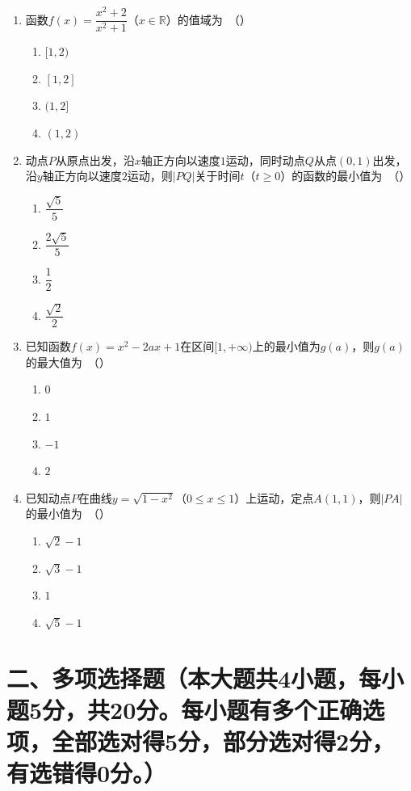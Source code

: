 \documentclass[12pt, a4paper]{ctexart}
\begin{document}
\begin{enumerate}
\item 函数$f(x)=\dfrac{x^2+2}{x^2+1}$（$x\in\mathbb{R}$）的值域为\ （\quad）
\begin{enumerate}[label=\Alph*., itemsep=0pt, topsep=2pt]
\item $[1,2)$ \quad \item $[1,2]$ \quad \item $(1,2]$ \quad \item $(1,2)$
\end{enumerate}

\item 动点$P$从原点出发，沿$x$轴正方向以速度$1$运动，同时动点$Q$从点$(0,1)$出发，沿$y$轴正方向以速度$2$运动，则$|PQ|$关于时间$t$（$t\geq 0$）的函数的最小值为\ （\quad）
\begin{enumerate}[label=\Alph*., itemsep=0pt, topsep=2pt]
\item $\dfrac{\sqrt{5}}{5}$ \quad \item $\dfrac{2\sqrt{5}}{5}$ \quad \item $\dfrac{1}{2}$ \quad \item $\dfrac{\sqrt{2}}{2}$
\end{enumerate}

\item 已知函数$f(x)=x^2-2ax+1$在区间$[1,+\infty)$上的最小值为$g(a)$，则$g(a)$的最大值为\ （\quad）
\begin{enumerate}[label=\Alph*., itemsep=0pt, topsep=2pt]
\item $0$ \quad \item $1$ \quad \item $-1$ \quad \item $2$
\end{enumerate}

\item 已知动点$P$在曲线$y=\sqrt{1-x^2}$（$0\leq x\leq 1$）上运动，定点$A(1,1)$，则$|PA|$的最小值为\ （\quad）
\begin{enumerate}[label=\Alph*., itemsep=0pt, topsep=2pt]
\item $\sqrt{2}-1$ \quad \item $\sqrt{3}-1$ \quad \item $1$ \quad \item $\sqrt{5}-1$
\end{enumerate}

\end{enumerate}

\section*{二、多项选择题（本大题共4小题，每小题5分，共20分。每小题有多个正确选项，全部选对得5分，部分选对得2分，有选错得0分。）}
\end{document}
